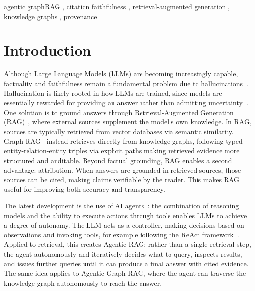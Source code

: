 \documentclass[
]{ceurart}
\begin{document}
\begin{keywords}
  agentic graphRAG \sep
  citation faithfulness \sep
  retrieval-augmented generation \sep
  knowledge graphs \sep
  provenance
\end{keywords}

\date{\today}
\maketitle

\section{Introduction}

Although Large Language Models (LLMs) are becoming increasingly capable, factuality and faithfulness remain a fundamental problem due to hallucinations~\cite{huang2025survey}. Hallucination is likely rooted in how LLMs are trained, since models are essentially rewarded for providing an answer rather than admitting uncertainty~\cite{kalai_evaluating_2026}. One solution is to ground answers through Retrieval-Augmented Generation (RAG)~\cite{RAG_origin}, where external sources supplement the model's own knowledge.  In RAG, sources are typically retrieved from vector databases via semantic similarity. Graph RAG~\cite{peng2025graph} instead retrieves directly from knowledge graphs, following typed entity-relation-entity triples via explicit paths making retrieved evidence more structured and auditable. Beyond factual grounding, RAG enables a second advantage: attribution. When answers are grounded in retrieved sources, those sources can be cited, making claims verifiable by the reader. This makes RAG useful for improving both accuracy and transparency.

The latest development is the use of AI agents~\cite{Abou_Ali_2025}: the combination of reasoning models and the ability to execute actions through tools enables LLMs to achieve a degree of autonomy. The LLM acts as a controller, making decisions based on observations and invoking tools, for example following the ReAct framework~\cite{yao2022react}. Applied to retrieval, this creates Agentic RAG: rather than a single retrieval step, the agent autonomously and iteratively decides what to query, inspects results, and issues further queries until it can produce a final answer with cited evidence. The same idea applies to Agentic Graph RAG, where the agent can traverse the knowledge graph autonomously to reach the answer.
\end{document}
